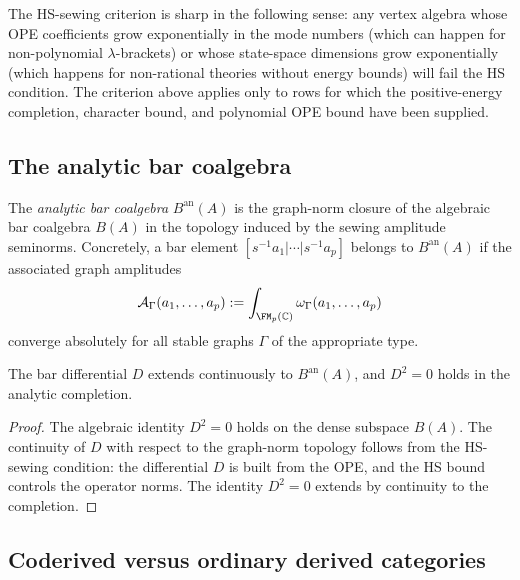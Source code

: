 \begin{remark}
The HS-sewing criterion is sharp in the following sense: any vertex algebra
whose OPE coefficients grow exponentially in the mode numbers (which can
happen for non-polynomial $\lambda$-brackets) or whose state-space
dimensions grow exponentially (which happens for non-rational theories
without energy bounds) will fail the HS condition.  The criterion above
applies only to rows for which the positive-energy completion,
character bound, and polynomial OPE bound have been supplied.
\end{remark}

\subsection{The analytic bar coalgebra}

\begin{definition}
The \emph{analytic bar coalgebra} $B^{\mathrm{an}}(A)$ is the
graph-norm closure of the algebraic bar coalgebra $B(A)$ in the
topology induced by the sewing amplitude seminorms. Concretely,
a bar element $[s^{-1}a_1|\cdots|s^{-1}a_p]$ belongs to
$B^{\mathrm{an}}(A)$ if the associated graph amplitudes
\[
\mathcal{A}_\Gamma(a_1,\dots,a_p)
:=
\int_{\FM_p(\mathbb{C})} \omega_\Gamma(a_1,\dots,a_p)
\]
converge absolutely for all stable graphs $\Gamma$ of the appropriate
type.
\end{definition}

\begin{proposition}[Analytic $D^2 = 0$; \ClaimStatusProvedHere]
The bar differential $D$ extends continuously to $B^{\mathrm{an}}(A)$,
and $D^2 = 0$ holds in the analytic completion.
\end{proposition}

\begin{proof}
The algebraic identity $D^2 = 0$ holds on the dense subspace $B(A)$.
The continuity of $D$ with respect to the graph-norm topology follows
from the HS-sewing condition: the differential $D$ is built from the
OPE, and the HS bound controls the operator norms. The identity
$D^2 = 0$ extends by continuity to the completion.
\end{proof}

\subsection{Coderived versus ordinary derived categories}

